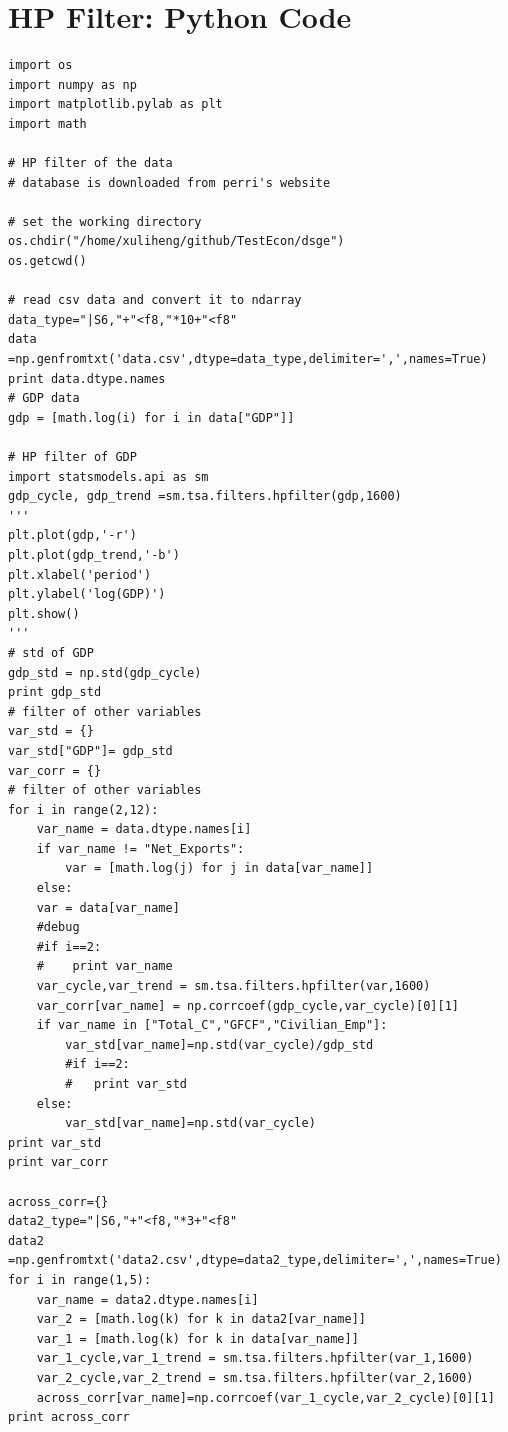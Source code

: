 \documentclass[11pt,a4paper]{article}
\begin{document}
\section{HP Filter: Python Code}
\begin{lstlisting}
import os 
import numpy as np
import matplotlib.pylab as plt
import math

# HP filter of the data
# database is downloaded from perri's website

# set the working directory
os.chdir("/home/xuliheng/github/TestEcon/dsge")
os.getcwd()

# read csv data and convert it to ndarray
data_type="|S6,"+"<f8,"*10+"<f8"
data =np.genfromtxt('data.csv',dtype=data_type,delimiter=',',names=True)
print data.dtype.names
# GDP data
gdp = [math.log(i) for i in data["GDP"]]

# HP filter of GDP
import statsmodels.api as sm 
gdp_cycle, gdp_trend =sm.tsa.filters.hpfilter(gdp,1600)
'''
plt.plot(gdp,'-r')
plt.plot(gdp_trend,'-b')
plt.xlabel('period')
plt.ylabel('log(GDP)')
plt.show()
'''
# std of GDP
gdp_std = np.std(gdp_cycle)
print gdp_std 
# filter of other variables
var_std = {}
var_std["GDP"]= gdp_std
var_corr = {}
# filter of other variables
for i in range(2,12):
    var_name = data.dtype.names[i]
    if var_name != "Net_Exports":
        var = [math.log(j) for j in data[var_name]]
    else:
	var = data[var_name]
    #debug
    #if i==2:
    #    print var_name
    var_cycle,var_trend = sm.tsa.filters.hpfilter(var,1600)
    var_corr[var_name] = np.corrcoef(gdp_cycle,var_cycle)[0][1]
    if var_name in ["Total_C","GFCF","Civilian_Emp"]:
        var_std[var_name]=np.std(var_cycle)/gdp_std      
        #if i==2:
        #   print var_std 
    else:
        var_std[var_name]=np.std(var_cycle)
print var_std 
print var_corr

across_corr={}
data2_type="|S6,"+"<f8,"*3+"<f8"
data2 =np.genfromtxt('data2.csv',dtype=data2_type,delimiter=',',names=True)
for i in range(1,5):
    var_name = data2.dtype.names[i]
    var_2 = [math.log(k) for k in data2[var_name]]
    var_1 = [math.log(k) for k in data[var_name]]
    var_1_cycle,var_1_trend = sm.tsa.filters.hpfilter(var_1,1600)
    var_2_cycle,var_2_trend = sm.tsa.filters.hpfilter(var_2,1600)
    across_corr[var_name]=np.corrcoef(var_1_cycle,var_2_cycle)[0][1]
print across_corr
\end{lstlisting}
\end{document}
